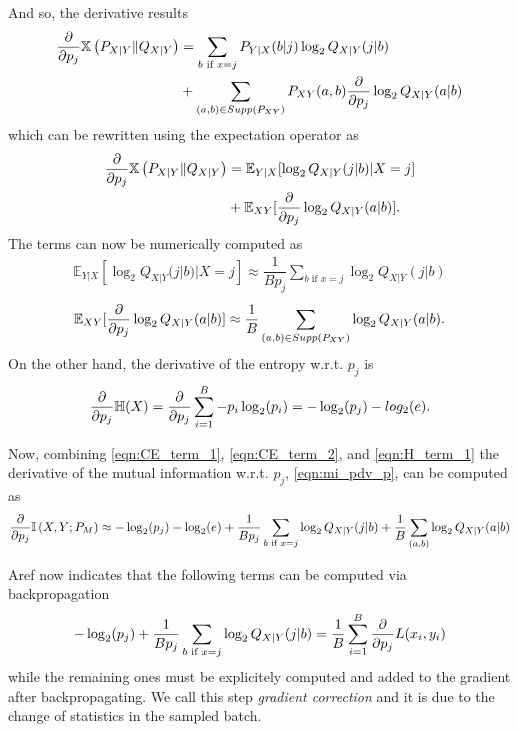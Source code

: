 And so, the derivative results
\begin{align}
	\pdv{p_j} \mathbb{X}\left(P_{X|Y} \Vert Q_{X|Y}\right) &= \sum \limits_{b \text{ if } x=j} P_{Y|X}(b|j) \log_2 Q_{X|Y}(j|b) \\
	& + \sum \limits_{(a,b) \in Supp(P_{XY})} P_{XY}(a, b) \pdv{p_j} \log_2 Q_{X|Y}(a|b)
\end{align}
which can be rewritten using the expectation operator as
\begin{align}
	\pdv{p_j} \mathbb{X}\left(P_{X|Y} \Vert Q_{X|Y}\right) &= \mathbb{E}_{Y|X}[ \log_2 Q_{X|Y}(j|b)| X=j] \\
	& + \mathbb{E}_{XY}[ \pdv{p_j} \log_2 Q_{X|Y}(a|b)].
\end{align}
The terms can now be numerically computed as
\begin{align}
\label{eqn:CE_term_1}
	\mathbb{E}_{Y|X}[ \log_2 Q_{X|Y}(j|b)| X=j] \approx \dfrac{1}{Bp_j}\sum \limits_{b \text{ if } x=j} \log_2 Q_{X|Y}(j|b)
\end{align}
\begin{align}
\label{eqn:CE_term_2}
	\mathbb{E}_{XY}[ \pdv{p_j} \log_2 Q_{X|Y}(a|b)] \approx \dfrac{1}{B} \sum \limits_{(a,b) \in Supp(P_{XY})} \log_2 Q_{X|Y}(a|b).
\end{align}
On the other hand, the derivative of the entropy w.r.t. $p_j$ is
\begin{align}
\label{eqn:H_term_1}
	\pdv{p_j} \mathbb{H}(X) = \pdv{p_j} \sum \limits_{i = 1}^{B} - p_i \log_2(p_i) = - \log_2 (p_j) - log_2 (e).
\end{align}

Now, combining \ref{eqn:CE_term_1}, \ref{eqn:CE_term_2}, and \ref{eqn:H_term_1} the derivative of the mutual information w.r.t. $p_j$, \ref{eqn:mi_pdv_p}, can be computed as
\begin{align}
	\pdv{p_j} \mathbb{I} \left(X , Y ; P_M \right) \approx - \log_2 (p_j) - \log_2 (e) + \dfrac{1}{Bp_j}\sum \limits_{b \text{ if } x=j} \log_2 Q_{X|Y}(j|b) + \dfrac{1}{B} \sum \limits_{(a,b)} \log_2 Q_{X|Y}(a|b)
\end{align}

Aref now indicates that the following terms can be computed via backpropagation
\begin{align}
	- \log_2 (p_j) + \dfrac{1}{Bp_j}\sum \limits_{b \text{ if } x=j} \log_2 Q_{X|Y}(j|b) = \dfrac{1}{B} \sum \limits_{i = 1}^{B} \pdv{p_j} L(x_i, y_i)
\end{align}
while the remaining ones must be explicitely computed and added to the gradient after backpropagating. We call this step \textit{gradient correction} and it is due to the change of statistics in the sampled batch.

